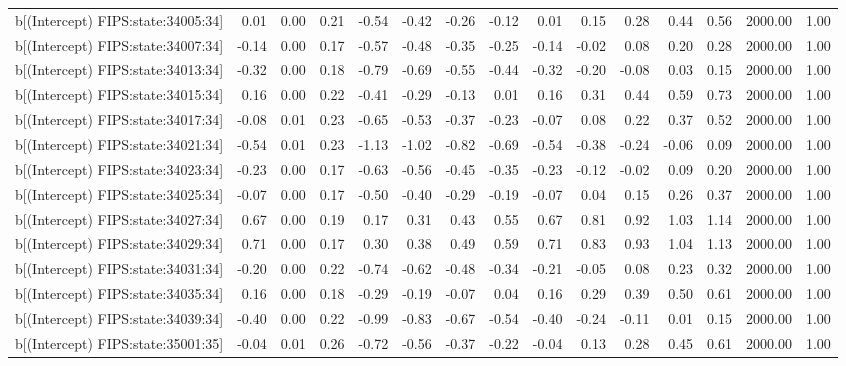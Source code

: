 \begin{table}[ht]
\begin{tabular}{rrrrrrrrrrrrrrr}
  b[(Intercept) FIPS:state:34005:34] & 0.01 & 0.00 & 0.21 & -0.54 & -0.42 & -0.26 & -0.12 & 0.01 & 0.15 & 0.28 & 0.44 & 0.56 & 2000.00 & 1.00 \\ 
  b[(Intercept) FIPS:state:34007:34] & -0.14 & 0.00 & 0.17 & -0.57 & -0.48 & -0.35 & -0.25 & -0.14 & -0.02 & 0.08 & 0.20 & 0.28 & 2000.00 & 1.00 \\ 
  b[(Intercept) FIPS:state:34013:34] & -0.32 & 0.00 & 0.18 & -0.79 & -0.69 & -0.55 & -0.44 & -0.32 & -0.20 & -0.08 & 0.03 & 0.15 & 2000.00 & 1.00 \\ 
  b[(Intercept) FIPS:state:34015:34] & 0.16 & 0.00 & 0.22 & -0.41 & -0.29 & -0.13 & 0.01 & 0.16 & 0.31 & 0.44 & 0.59 & 0.73 & 2000.00 & 1.00 \\ 
  b[(Intercept) FIPS:state:34017:34] & -0.08 & 0.01 & 0.23 & -0.65 & -0.53 & -0.37 & -0.23 & -0.07 & 0.08 & 0.22 & 0.37 & 0.52 & 2000.00 & 1.00 \\ 
  b[(Intercept) FIPS:state:34021:34] & -0.54 & 0.01 & 0.23 & -1.13 & -1.02 & -0.82 & -0.69 & -0.54 & -0.38 & -0.24 & -0.06 & 0.09 & 2000.00 & 1.00 \\ 
  b[(Intercept) FIPS:state:34023:34] & -0.23 & 0.00 & 0.17 & -0.63 & -0.56 & -0.45 & -0.35 & -0.23 & -0.12 & -0.02 & 0.09 & 0.20 & 2000.00 & 1.00 \\ 
  b[(Intercept) FIPS:state:34025:34] & -0.07 & 0.00 & 0.17 & -0.50 & -0.40 & -0.29 & -0.19 & -0.07 & 0.04 & 0.15 & 0.26 & 0.37 & 2000.00 & 1.00 \\ 
  b[(Intercept) FIPS:state:34027:34] & 0.67 & 0.00 & 0.19 & 0.17 & 0.31 & 0.43 & 0.55 & 0.67 & 0.81 & 0.92 & 1.03 & 1.14 & 2000.00 & 1.00 \\ 
  b[(Intercept) FIPS:state:34029:34] & 0.71 & 0.00 & 0.17 & 0.30 & 0.38 & 0.49 & 0.59 & 0.71 & 0.83 & 0.93 & 1.04 & 1.13 & 2000.00 & 1.00 \\ 
  b[(Intercept) FIPS:state:34031:34] & -0.20 & 0.00 & 0.22 & -0.74 & -0.62 & -0.48 & -0.34 & -0.21 & -0.05 & 0.08 & 0.23 & 0.32 & 2000.00 & 1.00 \\ 
  b[(Intercept) FIPS:state:34035:34] & 0.16 & 0.00 & 0.18 & -0.29 & -0.19 & -0.07 & 0.04 & 0.16 & 0.29 & 0.39 & 0.50 & 0.61 & 2000.00 & 1.00 \\ 
  b[(Intercept) FIPS:state:34039:34] & -0.40 & 0.00 & 0.22 & -0.99 & -0.83 & -0.67 & -0.54 & -0.40 & -0.24 & -0.11 & 0.01 & 0.15 & 2000.00 & 1.00 \\ 
  b[(Intercept) FIPS:state:35001:35] & -0.04 & 0.01 & 0.26 & -0.72 & -0.56 & -0.37 & -0.22 & -0.04 & 0.13 & 0.28 & 0.45 & 0.61 & 2000.00 & 1.00 \\ 

\end{tabular}
\end{table}
